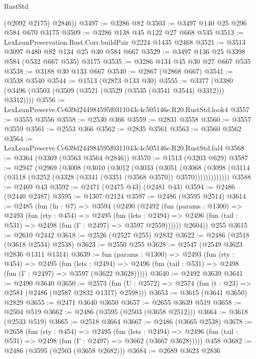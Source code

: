 \begin{lexlean}{RustStd}
\begin{coremodule}
        (@2092 @2175)
        @2846))
@3497 := @3286 @82
@3503 := @3497 @140 @25 @296 @584 @670 @3175
@3509 := @3286 @138 @45 @122 @27 @668 @535
@3513 := LexLeanPreservation.Rust.Corr.buildPair @2224 @1435 @2468
@3521 := @3513 @3097 @480 @82 @134 @25 @30 @584 @667
@3529 := @3497 @136 @25 @3398 @584 (@532 @667 @535) @3175
@3535 := @3286 @134 @45 @30 @27 @667 @535
@3538 := @3188 @30 @133 @667
@3540 := @2867 (@2868 @667)
@3541 := @3538 @3540
@3544 := @1513 (@2873 @133 @30)
@3555 := @3377 (@3380 (@3496 (@3503 (@3509 (@3521 (@3529 (@3535 (@3541 @3544) @3312))) @3312))))
@3556 := LexLeanPreserve.Cc639d244984595f0311043c4c505146e.R20.RustStd.look4
@3557 := @3555 @3556
@3558 := @2530 @366
@3559 := @2831 @3558
@3560 := @3557 @3559
@3561 := @2553 @366
@3562 := @2835 @3561
@3563 := @3560 @3562
@3564 := LexLeanPreserve.Cc639d244984595f0311043c4c505146e.R20.RustStd.fal4
@3568 := @3364 (@3369 (@3563 @3564 @2846))
@3570 := @1513 (@3203 @629)
@3587 := @2947
    (@2969
      (@3008
        (@3010
          (@3012
            (@3033
              (@3051
                (@3068
                  (@3098 (@3114 (@3118 (@3252 (@3328 (@3341 (@3351 (@3568 @3570)) @3570)))))))))))))
@3588 := @2469 @43
@3592 := @2471 (@2475 @43) (@2481 @43)
@3594 := @2486 (@2440 @2487)
@3595 := @1307 @2124
@3597 := @2486 (@3595 @2514)
@3614 := @2485
    (fun (fn : @7) =>
    @3594
      (@2490
        (@2492
          (fun (params : @1300) =>
          @2493
            (fun (rty : @454) =>
            @2495
              (fun (lets : @2494) =>
              @2496 (fun (tail : @531) => @2498 (fun (Γ : @2497) => @3597 @2559))))))
        @2604))
    @255
@3615 := @2610 @2442
@3618 := @2526 (@2527 @255) @2832
@3622 := @2486 (@2518 (@3618 @2534) @2538)
@3623 := @2550 @255
@3628 := @2547 (@2549 @3623 @2836 @1311 @1314)
@3639 := fun (params : @1300) =>
  @2493
    (fun (rty : @454) =>
    @2495
      (fun (lets : @2494) =>
      @2496 (fun (tail : @531) => @2498 (fun (Γ : @2497) => @3597 (@3622 @3628)))))
@3640 := @2492 @3639
@3641 := @2490 @3640
@3650 := @2573 (fun (U : @2572) => @2574 (fun (t : @23) => @2581 (@2486 (@2587 @2832 @1317) @2598)))
@3653 := @3615 (@3641 @3650) @2829
@3655 := @2471 @3640 @3650
@3657 := @2655 @3639 @519
@3658 := @2504 @519
@3662 := @2486 (@3595 (@2503 (@3658 @2512)))
@3664 := @3618 (@2533 @519)
@3665 := @2518 @3664
@3667 := @2486 (@3665 @2538)
@3678 := @2658
    (fun (rty : @454) =>
    @2495
      (fun (lets : @2494) =>
      @2496 (fun (tail : @531) => @2498 (fun (Γ : @2497) => @3662 (@3667 @3628)))))
    @458
@3682 := @2486 (@3595 (@2503 (@3658 @2682)))
@3684 := @2689 @3623 @2836

\end{coremodule}
\end{lexlean}
